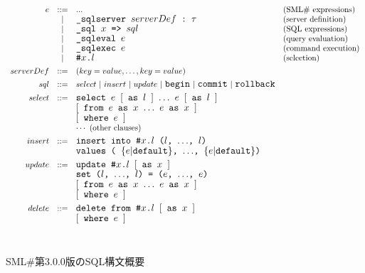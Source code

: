 \documentclass{jbook}
\newcommand{\txt}[2]{#1}
\newcommand{\smlsharp}{SML\#}
\newcommand{\version}{3.0.0}
\newcommand{\code}[1]{\mbox{\large\tt #1}}
\newcommand{\vbar}{\mbox{\ $|$\ }}
\begin{document}
\begin{figure}
\begin{center}
\[
\begin{array}{rcll}
  e &::=& ... & \mbox{(\smlsharp{} expressions)}
\\  &|& \code{\_sqlserver $serverDef$~:~$\tau$} 
	& \mbox{(server definition)}
\\  &|& \code{\_sql $x$ => $sql$} 
	& \mbox{(SQL expressions)}
\\  &|& \code{\_sqleval $e$}
	& \mbox{(query evaluation)}
\\  &|& \code{\_sqlexec $e$}
	& \mbox{(command execution)}
\\  &|& \code{\#$x$.$l$}
	& \mbox{(selection)}
\\[1ex]
serverDef &::=& (key = value,\ldots,key = value)
\\[1ex]
  sql &::=& select
\vbar insert
\vbar update
\vbar \code{begin}
\vbar \code{commit}
\vbar \code{rollback}
\\[1ex]
select &::=& 
     \code{select $e$ $[$ as $l$ $]$ $\ldots$ $e$ $[$ as $l$ $]$}
\\&& \code{$[$ from $e$ as $x$ $\ldots$ $e$ as $x$ $]$}
\\&& \code{$[$ where $e$ $]$}
\\&& \cdots\ \mbox{(other clauses)}
\\[1ex]
insert &::=& 
\code{insert into \#$x$.$l$ ($l$, $\ldots$, $l$)}
\\&& \code{values ( $\{e|$default$\}$, $\ldots$, $\{e|$default$\}$)}
\\[1ex]
update &::=& 
   \code{update \#$x$.$l$ $[$ as $x$ $]$}
\\&& \code{set ($l$, $\ldots$, $l$) = ($e$, $\ldots$, $e$)}
\\&& \code{$[$ from $e$ as $x$ $\ldots$ $e$ as $x$ $]$}
\\&& \code{$[$ where $e$ $]$}
\\[1ex]
delete &::=& 
   \code{delete from \#$x$.$l$ $[$ as $x$ $]$}
\\&& \code{$[$ where $e$ $]$}
\end{array}
\]
\ \\
\caption{\txt{\smlsharp{}第\version{}版のSQL構文概要}{SQL expressions in \smlsharp{} version \version{}}}
\end{center}
\label{fig:sqlSyntax}
\end{figure}
\end{document}
